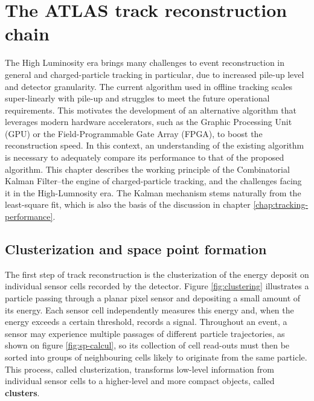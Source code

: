 \chapter{The ATLAS track reconstruction chain}
\label{chap:atlas-reco-chain}

The High Luminosity era brings many challenges to event reconstruction in general and charged-particle tracking in particular, due to increased pile-up level and detector granularity. 
The current algorithm used in offline tracking scales super-linearly with pile-up and struggles to meet the future operational requirements. 
This motivates the development of an alternative algorithm that leverages modern hardware accelerators, such as the Graphic Processing Unit (GPU) or the Field-Programmable Gate Array (FPGA), to boost the reconstruction speed.
In this context, an understanding of the existing algorithm is necessary to adequately compare its performance to that of the proposed algorithm. 
This chapter describes the working principle of the Combinatorial Kalman Filter--the engine of charged-particle tracking, and the challenges facing it in the High-Lumnosity era.
The Kalman mechanism stems naturally from the least-square fit, which is also the basis of the discussion in chapter \ref{chap:tracking-performance}.

\section{Clusterization and space point formation}
\label{sect:cluster-spacepoint}

The first step of track reconstruction is the clusterization of the energy deposit on individual sensor cells recorded by the detector.
Figure \ref{fig:clustering} illustrates a particle passing through a planar pixel sensor and depositing a small amount of its energy. 
Each sensor cell independently measures this energy and, when the energy exceeds a certain threshold, records a signal.
Throughout an event, a sensor may experience multiple passages of different particle trajectories, as shown on figure \ref{fig:sp-calcul}, so its collection of cell read-outs must then be sorted into groups of neighbouring cells likely to originate from the same particle. 
This process, called clusterization, transforms low-level information from individual sensor cells to a higher-level and more compact objects, called \textbf{clusters}. 

